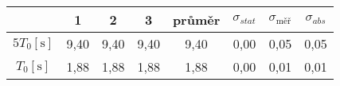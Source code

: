 \begin{tabular}{cccccccc}																													\toprule
						&	1		&	2		&	3		&	průměr	&	$\sigma_{stat}$	&	$\sigma_{\text{měř}}$	&	$\sigma_{abs}$	\\	\midrule
$5 T_0 [\si{\second}]$	&	9,40	&	9,40	&	9,40	&	9,40	&	0,00			&	0,05					&	0,05			\\
$T_0 [\si{\second}]$	&	1,88	&	1,88	&	1,88	&	1,88	&	0,00			&	0,01					&	0,01			\\	\bottomrule
\end{tabular}